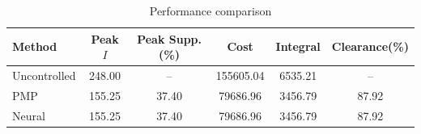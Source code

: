 \begin{table}[htbp]
\centering
\caption{Performance comparison}
\label{tab:results}
\begin{tabular}{lccccc}
\toprule
Method & Peak $I$ & Peak Supp.(\%) & Cost & Integral & Clearance(\%) \\
\midrule
Uncontrolled & 248.00 & -- & 155605.04 & 6535.21 & -- \\
PMP & 155.25 & 37.40 & 79686.96 & 3456.79 & 87.92 \\
Neural & 155.25 & 37.40 & 79686.96 & 3456.79 & 87.92 \\
\bottomrule
\end{tabular}
\end{table}
